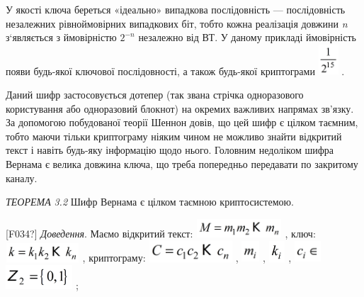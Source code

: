 У якості ключа береться «ідеально» випадкова послідовність --- послідовність
незалежних рівноймовірних випадкових біт, тобто кожна реалізація довжини 
\textit{n }з‘являється з ймовірністю  $2^{-n}$ незалежно від ВТ. У даному
прикладі ймовірність появи будь-якої ключової послідовності, а також будь-якої
криптограми  
\includegraphics[width=0.2917in,height=0.4437in]{crypt-img/crypt-img26.png} .

Даний шифр застосовується дотепер (так звана стрічка одноразового користування
або одноразовий блокнот) на окремих важливих напрямах зв’язку. За допомогою
побудованої теорії Шеннон  довів, що цей шифр  є цілком таємним, тобто маючи
тільки криптограму  ніяким чином не можливо знайти відкритий текст і навіть
будь-яку інформацію щодо нього. Головним недоліком шифра Вернама є велика
довжина ключа, що треба попередньо передавати по закритому каналу. 


\bigskip

\textit{ТЕОРЕМА }\textit{3}\textit{.2  }Шифр Вернама є цілком таємною
криптосистемою.

\textlatin{[F034?]} \textit{Доведення}. Маємо відкритий текст: 
\includegraphics[width=1.2591in,height=0.2709in]{crypt-img/crypt-img27.png} ,
ключ: 
\includegraphics[width=1.0827in,height=0.2791in]{crypt-img/crypt-img28.png} ,
криптограму: 
\includegraphics[width=1.2283in,height=0.3146in]{crypt-img/crypt-img29.png} , 
\includegraphics[width=0.2591in,height=0.3063in]{crypt-img/crypt-img30.png} , 
\includegraphics[width=0.2402in,height=0.3118in]{crypt-img/crypt-img31.png} , 
\includegraphics[width=0.3929in,height=0.3126in]{crypt-img/crypt-img32.png} 
\includegraphics[width=0.9835in,height=0.3547in]{crypt-img/crypt-img33.png} ;

